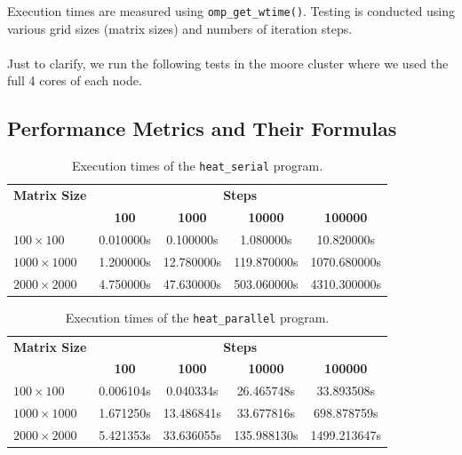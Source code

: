 \documentclass[12pt]{article}
\begin{document}
Execution times are measured using \texttt{omp\_get\_wtime()}.
Testing is conducted using various grid sizes (matrix sizes) and numbers of iteration steps.
\\\\
Just to clarify, we run the following tests in the moore cluster where we used the full 4 cores of each node.

\subsection{Performance Metrics and Their Formulas}


\begin{table}[h!]
	\centering
	\begin{tabular}{lcccc}
		\hline
		\textbf{Matrix Size} & \multicolumn{4}{c}{\textbf{Steps}}                                                    \\
		\cline{2-5}
		                     & \textbf{100}                       & \textbf{1000} & \textbf{10000} & \textbf{100000} \\
		\hline
		$100\times 100$      & 0.010000s                          & 0.100000s     & 1.080000s      & 10.820000s      \\
		$1000\times 1000$    & 1.200000s                          & 12.780000s    & 119.870000s    & 1070.680000s    \\
		$2000\times 2000$    & 4.750000s                          & 47.630000s    & 503.060000s    & 4310.300000s    \\
		\hline
	\end{tabular}
	\caption{Execution times of the \texttt{heat\_serial} program.}
	\label{tab:serial_times}
\end{table}

\begin{table}[h!]
	\centering
	\begin{tabular}{lcccc}
		\hline
		\textbf{Matrix Size} & \multicolumn{4}{c}{\textbf{Steps}}                                                    \\
		\cline{2-5}
		                     & \textbf{100}                       & \textbf{1000} & \textbf{10000} & \textbf{100000} \\
		\hline
		$100\times 100$      & 0.006104s                          & 0.040334s     & 26.465748s     & 33.893508s      \\
		$1000\times 1000$    & 1.671250s                          & 13.486841s    & 33.677816s     & 698.878759s     \\
		$2000\times 2000$    & 5.421353s                          & 33.636055s    & 135.988130s    & 1499.213647s    \\
		\hline
	\end{tabular}
	\caption{Execution times of the \texttt{heat\_parallel} program.}
	\label{tab:omp_times}
\end{table}
\end{document}
